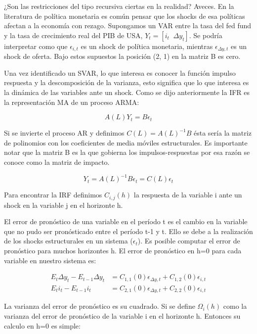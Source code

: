 \documentclass[
]{book}
\begin{document}
¿Son las restricciones del tipo recursiva ciertas en la realidad? Aveces. En la literatura de política monetaria es común pensar que los shocks de esa políticas afectan a la economía con rezago. Supongamos un VAR entre la tasa del fed fund y la tasa de crecimiento real del PIB de USA, \(Y_{t}=[i_{t}\;\; \Delta y_{t}]\). Se podría interpretar como que \(\epsilon_{i,t}\) es un shock de política monetaria, mientras \(\epsilon_{\Delta y,t}\) es un shock de oferta. Bajo estos supuestos la posición (2, 1) en la matriz B es cero.

Una vez identificado un SVAR, lo que interesa es conocer la función impulso respuesta y la descomposición de la varianza, esto significa que lo que interesa es la dinámica de las variables ante un shock. Como se dijo anteriormente la IFR es la representación MA de un proceso ARMA:

\begin{equation}
A(L)Y_{t}=B\epsilon_{t}
\end{equation}

Si se invierte el proceso AR y definimos \(C(L)=A(L)^{-1}B\) ésta sería la matriz de polinomios con los coeficientes de media móviles estructurales. Es importante notar que la matriz B es la que gobierna los impulsos-respuestas por esa razón se conoce como la matriz de impacto.

\begin{equation}
Y_{t}=A(L)^{-1}B\epsilon_{t}=C(L)\epsilon_{t}
\end{equation}

Para encontrar la IRF definimos \(C_{i,j}(h)\) la respuesta de la variable i ante un shock en la variable j en el horizonte h.

El error de pronóstico de una variable en el período t es el cambio en la variable que no pudo ser pronósticado entre el período t-1 y t. Ello se debe a la realización de los shocks estructurales en un sistema (\(\epsilon_{t}\)). Es posible computar el error de pronóstico para muchos horizontes h. El error de pronóstico en h=0 para cada variable en nuestro sistema es:

\begin{align}
E_{t}\Delta y_{t}-E_{t-1}\Delta y_{t}&=C_{1,1}(0)\epsilon_{\Delta y, t}+C_{1,2}(0)\epsilon_{i, t}\\
E_{t}i_{t}-E_{t-1}i_{t}&=C_{2,1}(0)\epsilon_{\Delta y, t}+C_{2,2}(0)\epsilon_{i, t}
\end{align}

La varianza del error de pronóstico es su cuadrado. Si se define \(\Omega_{i}(h)\) como la varianza del error de pronóstico de la variable i en el horizonte h. Entonces su calculo en h=0 es simple:
\end{document}
